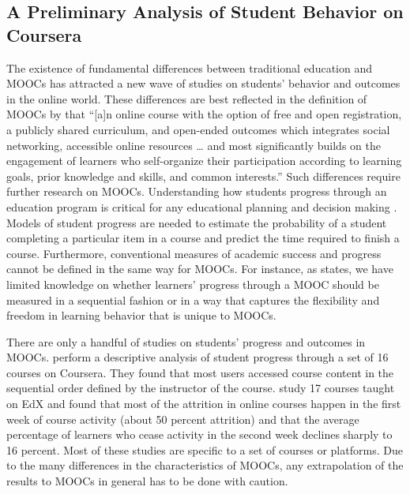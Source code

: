 \subsection{A Preliminary Analysis of Student Behavior on
Coursera}\label{a-preliminary-analysis-of-student-behavior-on-coursera}

The existence of fundamental differences between traditional education
and MOOCs has attracted a new wave of studies on students' behavior and
outcomes in the online world. These differences are best reflected in
the definition of MOOCs by \cite{mcauley2010mooc} that ``{[}a{]}n online
course with the option of free and open registration, a publicly shared
curriculum, and open-ended outcomes which integrates social networking,
accessible online resources \ldots{} and most significantly builds on
the engagement of learners who self-organize their participation
according to learning goals, prior knowledge and skills, and common
interests.'' Such differences require further research on MOOCs.
Understanding how students progress through an education program is
critical for any educational planning and decision making
\citep{king1972primary}. Models of student progress are needed to
estimate the probability of a student completing a particular item in a
course and predict the time required to finish a course. Furthermore,
conventional measures of academic success and progress cannot be defined
in the same way for MOOCs. For instance, as \cite{perna2014moving}
states, we have limited knowledge on whether learners' progress through
a MOOC should be measured in a sequential fashion or in a way that
captures the flexibility and freedom in learning behavior that is unique
to MOOCs.

There are only a handful of studies on students' progress and outcomes
in MOOCs. \cite{perna2014moving} perform a descriptive analysis of
student progress through a set of 16 courses on Coursera. They found
that most users accessed course content in the sequential order defined
by the instructor of the course. \cite{ho2014harvardx} study 17 courses
taught on EdX and found that most of the attrition in online courses
happen in the first week of course activity (about 50 percent attrition)
and that the average percentage of learners who cease activity in the
second week declines sharply to 16 percent. Most of these studies are
specific to a set of courses or platforms. Due to the many differences
in the characteristics of MOOCs, any extrapolation of the results to
MOOCs in general has to be done with caution.

